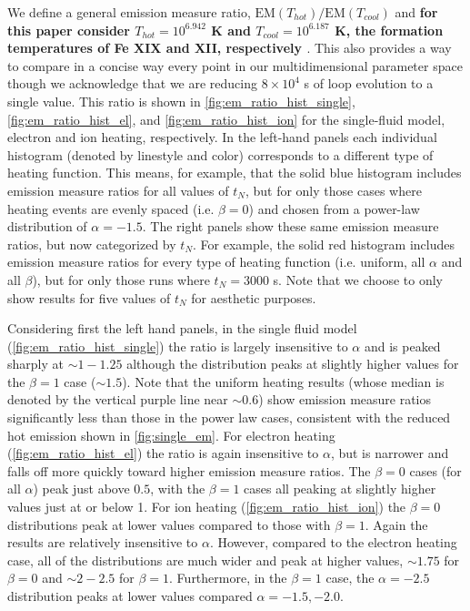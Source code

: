 \documentclass[preprint]{aastex}
\begin{document}
	\par We define a general emission measure ratio, $\mathrm{EM}(T_{hot})/\mathrm{EM}(T_{cool})$ and \textbf{for this paper consider $T_{hot}=10^{6.942}$ K and $T_{cool}=10^{6.187}$ K, the formation temperatures of Fe XIX and XII, respectively \citep[i.e. the temperature $T$ which maximizes the contribution function $G_{\lambda}(T)$ calculated using CHIANTI v8,][]{dere_chianti_1997,del_zanna_chianti_2015}}. This also provides a way to compare in a concise way every point in our multidimensional parameter space though we acknowledge that we are reducing $8\times10^4$ s of loop evolution to a single value. This ratio is shown in \autoref{fig:em_ratio_hist_single}, \autoref{fig:em_ratio_hist_el}, and \autoref{fig:em_ratio_hist_ion} for the single-fluid model, electron and ion heating, respectively. In the left-hand panels each individual histogram (denoted by linestyle and color) corresponds to a different type of heating function. This means, for example, that the solid blue histogram includes emission measure ratios for all values of $t_N$, but for only those cases where heating events are evenly spaced (i.e. $\beta=0$) and chosen from a power-law distribution of $\alpha=-1.5$. The right panels show these same emission measure ratios, but now categorized by $t_N$. For example, the solid red histogram includes emission measure ratios for every type of heating function (i.e. uniform, all $\alpha$ and all $\beta$), but for only those runs where $t_N=3000$ s. Note that we choose to only show results for five values of $t_N$ for aesthetic purposes.
%
	\par Considering first the left hand panels, in the single fluid model (\autoref{fig:em_ratio_hist_single}) the ratio is largely insensitive to $\alpha$ and is peaked sharply at $\sim1-1.25$ although the distribution peaks at slightly higher values for the $\beta=1$ case ($\sim1.5$). Note that the uniform heating results (whose median is denoted by the vertical purple line near $\sim0.6$) show emission measure ratios significantly less than those in the power law cases, consistent with the reduced hot emission shown in \autoref{fig:single_em}. For electron heating (\autoref{fig:em_ratio_hist_el}) the ratio is again insensitive to $\alpha$, but is narrower and falls off more quickly toward higher emission measure ratios. The $\beta=0$ cases (for all $\alpha$) peak just above $0.5$, with the $\beta=1$ cases all peaking at slightly higher values just at or below 1. For ion heating (\autoref{fig:em_ratio_hist_ion}) the $\beta=0$ distributions peak at lower values compared to those with $\beta=1$. Again the results are relatively insensitive to $\alpha$. However, compared to the electron heating case, all of the distributions are much wider and peak at higher values, $\sim1.75$ for $\beta=0$ and $\sim2-2.5$ for $\beta=1$. Furthermore, in the $\beta=1$ case, the $\alpha=-2.5$ distribution peaks at lower values compared $\alpha=-1.5,-2.0$.
\end{document}
